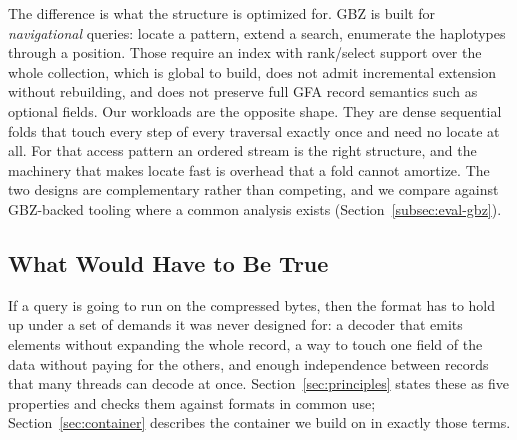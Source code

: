 The difference is what the structure is optimized for. GBZ is built for
\emph{navigational} queries: locate a pattern, extend a search, enumerate the
haplotypes through a position. Those require an index with rank/select support
over the whole collection, which is global to build, does not admit incremental
extension without rebuilding, and does not preserve full GFA record semantics such
as optional fields. Our workloads are the opposite shape. They are dense sequential
folds that touch every step of every traversal exactly once and need no locate at
all. For that access pattern an ordered stream is the right structure, and the
machinery that makes locate fast is overhead that a fold cannot amortize. The two
designs are complementary rather than competing, and we compare against GBZ-backed
tooling where a common analysis exists (Section~\ref{subsec:eval-gbz}).

\subsection{What Would Have to Be True}
\label{subsec:bg-requirements}

If a query is going to run on the compressed bytes, then the format has to hold up
under a set of demands it was never designed for: a decoder that emits elements
without expanding the whole record, a way to touch one field of the data without
paying for the others, and enough independence between records that many threads
can decode at once. Section~\ref{sec:principles} states these as five properties
and checks them against formats in common use; Section~\ref{sec:container}
describes the container we build on in exactly those terms.
